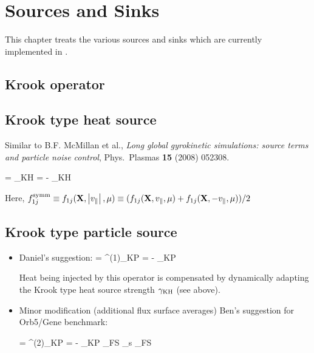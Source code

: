\chapter{Sources and Sinks}
This chapter treats the various sources and sinks which are currently implemented in \gene.

\section{Krook operator}

\section{Krook type heat source}

Similar to B.F. McMillan et al., {\em Long global gyrokinetic simulations: source terms and particle noise control}, Phys.~Plasmas {\bf 15} (2008) 052308.

\bea
{} = _{\rm KH} 
= - \gamma_{\rm KH}  \label{eq:krookheat_def}
\eea

Here, $f_{1j}^{\rm symm} \equiv f_{1j}(\mathbf{X},\left| v_\| \right|,\mu) \equiv (f_{1j}(\mathbf{X},v_\|,\mu)+f_{1j}(\mathbf{X},-v_\|,\mu))/2$

\section{Krook type particle source}

\begin{itemize}
\item Daniel's suggestion:
\bea
{} = ^{(1)}_{\rm KP} 
= - \gamma_{\rm KP}  \label{eq:krookpart1_def}
\eea

Heat being injected by this operator is compensated by dynamically adapting the Krook type heat source strength $\gamma_{\rm KH}$ (see above).

\item Minor modification (additional flux surface averages) Ben's suggestion for {\sc Orb}5/{\sc Gene} benchmark:

\bea
{} = ^{(2)}_{\rm KP} 
= - \gamma_{\rm KP} _{\rm FS} 
{\sum_s _{\rm FS}} \label{eq:krookpart2_def}
\eea

\end{itemize}


